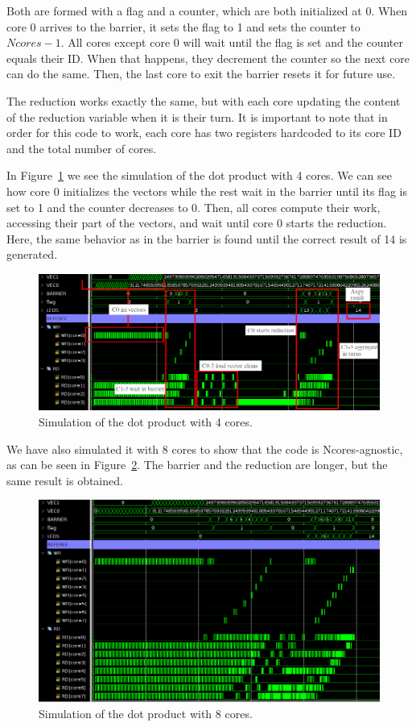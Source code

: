 Both are formed with a flag and a counter, which are both initialized at 0.
When core 0 arrives to the barrier, it sets the flag to 1 and sets the counter to $Ncores - 1$.
All cores except core 0 will wait until the flag is set and the counter equals their ID.
When that happens, they decrement the counter so the next core can do the same.
Then, the last core to exit the barrier resets it for future use.


The reduction works exactly the same, but with each core updating the content of the reduction variable when it is their turn.
It is important to note that in order for this code to work, each core has two registers hardcoded to its core ID and the total number of cores.


In Figure~\ref{4dot-sim} we see the simulation of the dot product with 4 cores.
We can see how core 0 initializes the vectors while the rest wait in the barrier until its flag is set to 1 and the counter decreases to 0.
Then, all cores compute their work, accessing their part of the vectors, and wait until core 0 starts the reduction.
Here, the same behavior as in the barrier is found until the correct result of 14 is generated.


\begin{figure}[h!]
    \centering
    \includegraphics[width=1\textwidth]{images/axpy_sim4_crop_arrow.png}
    \caption{Simulation of the dot product with 4 cores.}
    \label{4dot-sim}
\end{figure}

We have also simulated it with 8 cores to show that the code is Ncores-agnostic, as can be seen in Figure~\ref{8dot-sim}.
The barrier and the reduction are longer, but the same result is obtained.

\begin{figure}[h!]
    \centering
    \includegraphics[width=.9\textwidth]{images/axpy_sim8_crop.png}
    \caption{Simulation of the dot product with 8 cores.}
    \label{8dot-sim}
\end{figure}










